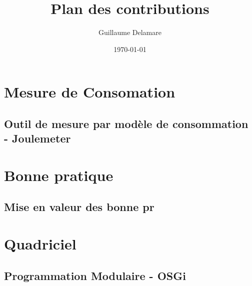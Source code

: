 \documentclass[a4paper, 11pt]{article}
\title{Plan des contributions}
\author{Guillaume Delamare}
\date{\today}
\begin{document}
    \maketitle
    \tableofcontents

    \section{Mesure de Consomation}
	\subsection{Outil de mesure par modèle de consommation - Joulemeter}
	    

    \section{Bonne pratique}
	\subsection{Mise en valeur des  bonne pr}

    \section{Quadriciel}
	\subsection{Programmation Modulaire - OSGi}
	    \subsubsection{}
	\subsection{}
\end{document}
